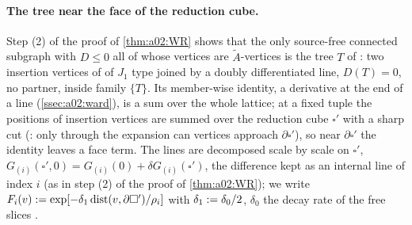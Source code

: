 \paragraph{The tree near the face of the reduction cube.} Step (2) of the proof of \cref{thm:a02:WR} shows that the only source-free connected subgraph with $D\le0$ all of whose vertices are $\tilde A$-vertices is the tree $T$ of \cite[(2.4)]{Ba3}: two insertion vertices of \cite[(3.52)--(3.53)]{K1} of $J_1$ type joined by a doubly differentiated line, $D(T)=0$, no partner, inside family $\{T\}$. Its member-wise identity, a derivative at the end of a line (\cref{ssec:a02:ward}), is a sum over the whole lattice; at a fixed tuple the positions of insertion vertices are summed over the reduction cube $\square'$ with a sharp cut (\cite[p.~668]{K1}: only through the expansion \cite[(3.52)]{K1} can vertices approach $\partial\square'$), so near $\partial\square'$ the identity leaves a face term. The lines are decomposed scale by scale on $\square'$, $G_{(i)}(\square',0)=G_{(i)}(0)+\delta G_{(i)}(\square')$, the difference kept as an internal line of index $i$ (as in step (2) of the proof of \cref{thm:a02:WR}); we write $F_i(v):=\exp[-\delta_1\operatorname{dist}(v,\partial\square')/\rho_i]$ with $\delta_1:=\delta_0/2$, $\delta_0$ the decay rate of the free slices \cite[(3.63)]{K1}.

